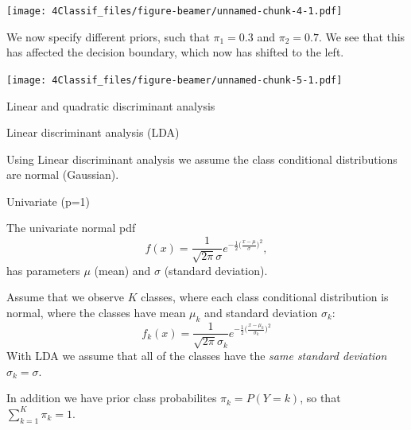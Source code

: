 \documentclass[10pt,ignorenonframetext,]{beamer}
\begin{document}
\begin{frame}

\texttt{[image: 4Classif\_files/figure-beamer/unnamed-chunk-4-1.pdf]}

\end{frame}

\begin{frame}

We now specify different priors, such that \(\pi_1 = 0.3\) and
\(\pi_2 = 0.7\). We see that this has affected the decision boundary,
which now has shifted to the left.

\texttt{[image: 4Classif\_files/figure-beamer/unnamed-chunk-5-1.pdf]}

\end{frame}

\begin{frame}{Linear and quadratic discriminant analysis}

\begin{block}{Linear discriminant analysis (LDA)}

Using Linear discriminant analysis we assume the class conditional
distributions are normal (Gaussian).

\begin{block}{Univariate (p=1)}

The univariate normal pdf
\[f(x) = \frac{1}{\sqrt{2\pi}\sigma} e^{-\frac{1}{2}\big(\frac{x-\mu}{\sigma}\big)^2},\]
has parameters \(\mu\) (mean) and \(\sigma\) (standard deviation).

Assume that we observe \(K\) classes, where each class conditional
distribution is normal, where the classes have mean \(\mu_k\) and
standard deviation \(\sigma_k\):
\[f_k(x) = \frac{1}{\sqrt{2\pi}\sigma_k} e^{-\frac{1}{2}\big(\frac{x-\mu_k}{\sigma_k}\big)^2}\]
With LDA we assume that all of the classes have the \emph{same standard
deviation} \(\sigma_k = \sigma\).

In addition we have prior class probabilites \(\pi_k=P(Y=k)\), so that
\(\sum_{k=1}^K \pi_k=1\).

\end{block}

\end{block}

\end{frame}
\end{document}

